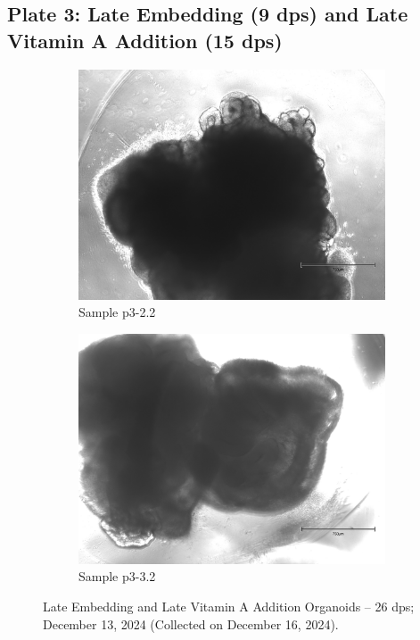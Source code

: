 \documentclass[11pt]{article}
\begin{document}
\subsection{Plate 3: Late Embedding (9 dps) and Late Vitamin A Addition (15 dps)}

\begin{figure}[H]
    \centering
    \begin{subfigure}[b]{0.40\textwidth}
        \centering
        \includegraphics[width=\textwidth]{p3-2.2.jpeg}
        \caption{Sample p3-2.2}
        \label{fig:p3-2.2}
    \end{subfigure}
    \hfill
    \begin{subfigure}[b]{0.40\textwidth}
        \centering
        \includegraphics[width=\textwidth]{p3-3.2.jpeg}
        \caption{Sample p3-3.2}
        \label{fig:p3-3.2}
    \end{subfigure}
    \caption{Late Embedding and Late Vitamin A Addition Organoids -- 26 dps; December 13, 2024 (Collected on December 16, 2024).}
    \label{fig:p3_gallery}
\end{figure}
\end{document}
